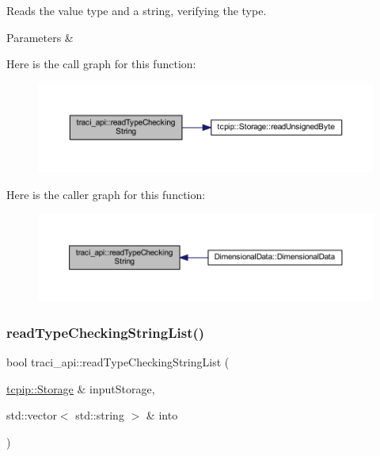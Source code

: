 Reads the value type and a string, verifying the type. 


\begin{DoxyParams}{Parameters}
{\em } & \\
\hline
\end{DoxyParams}
Here is the call graph for this function\+:\nopagebreak
\begin{figure}[H]
\begin{center}
\leavevmode
\includegraphics[width=350pt]{namespacetraci__api_ac51a66efdbed4dcdcef596643fe387ec_cgraph}
\end{center}
\end{figure}
Here is the caller graph for this function\+:\nopagebreak
\begin{figure}[H]
\begin{center}
\leavevmode
\includegraphics[width=350pt]{namespacetraci__api_ac51a66efdbed4dcdcef596643fe387ec_icgraph}
\end{center}
\end{figure}
\mbox{\label{namespacetraci__api_aa16305c07ac5f8221d9099f2e3a7531c}} 
\subsubsection{\texorpdfstring{read\+Type\+Checking\+String\+List()}{readTypeCheckingStringList()}}
{\footnotesize\ttfamily bool traci\+\_\+api\+::read\+Type\+Checking\+String\+List (\begin{DoxyParamCaption}\item[{\hyperlink{classtcpip_1_1_storage}{tcpip\+::\+Storage} \&}]{input\+Storage,  }\item[{std\+::vector$<$ std\+::string $>$ \&}]{into }\end{DoxyParamCaption})}




